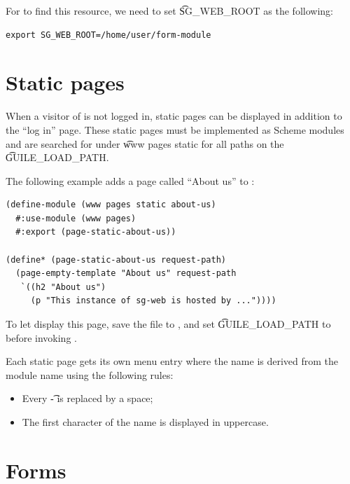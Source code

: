   For  to find this resource, we need to set \t{SG\_WEB\_ROOT}
  as the following:
\begin{siderules}
\begin{verbatim}
export SG_WEB_ROOT=/home/user/form-module
\end{verbatim}
\end{siderules}

\section{Static pages}
\label{sec:static-pages}

  When a visitor of  is not logged in, static pages
  can be displayed in addition to the ``log in'' page.  These static pages
  must be implemented as Scheme modules and are searched for under
  \t{www pages static} for all paths on the \t{GUILE\_LOAD\_PATH}.

  The following example adds a page called ``About us'' to :

\begin{siderules}
\begin{verbatim}
(define-module (www pages static about-us)
  #:use-module (www pages)
  #:export (page-static-about-us))

(define* (page-static-about-us request-path)
  (page-empty-template "About us" request-path
   `((h2 "About us")
     (p "This instance of sg-web is hosted by ..."))))
\end{verbatim}
\end{siderules}

  To let  display this page, save the file to
  , and set
  \t{GUILE\_LOAD\_PATH} to  before invoking .

  Each static page gets its own menu entry where the name is derived from the
  module name using the following rules:
  \begin{itemize}
    \item{Every \t{-} is replaced by a space;}
    \item{The first character of the name is displayed in uppercase.}
  \end{itemize}

\section{Forms}
\label{sec:forms}


